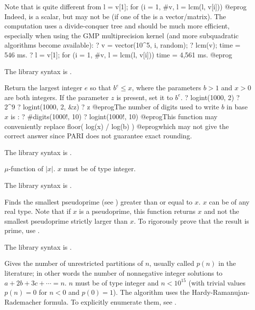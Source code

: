 Note that  is quite different from
\bprog
l = v[1]; for (i = 1, #v, l = lcm(l, v[i]))
@eprog\noindent
Indeed,  is a scalar, but  may not be (if one of
the  is a vector/matrix). The computation uses a divide-conquer tree
and should be much more efficient, especially when using the GMP
multiprecision kernel (and more subquadratic algorithms become available):
\bprog
? v = vector(10^5, i, random);
? lcm(v);
time = 546 ms.
? l = v[1]; for (i = 1, #v, l = lcm(l, v[i]))
time = 4,561 ms.
@eprog

The library syntax is .

\label{se:logint}
Return the largest integer $e$ so that $b^e \leq x$, where the
parameters $b > 1$ and $x > 0$ are both integers. If the parameter $z$ is
present, set it to $b^e$.
\bprog
? logint(1000, 2)
? 2^9
? logint(1000, 2, &z)
? z
@eprog\noindent The number of digits used to write $b$ in base $x$ is
:
\bprog
? #digits(1000!, 10)
? logint(1000!, 10)
@eprog\noindent This function may conveniently replace
\bprog
  floor( log(x) / log(b) )
@eprog\noindent which may not give the correct answer since PARI
does not guarantee exact rounding.

The library syntax is .

\label{se:moebius}
 $\mu$-function of $|x|$. $x$ must be of type integer.

The library syntax is .

\label{se:nextprime}
Finds the smallest pseudoprime (see
) greater than or equal to $x$. $x$ can be of any real
type. Note that if $x$ is a pseudoprime, this function returns $x$ and not
the smallest pseudoprime strictly larger than $x$. To rigorously prove that
the result is prime, use .

The library syntax is .

\label{se:numbpart}
Gives the number of unrestricted partitions of
$n$, usually called $p(n)$ in the literature; in other words the number of
nonnegative integer solutions to $a+2b+3c+\cdots=n$. $n$ must be of type
integer and $n<10^{15}$ (with trivial values $p(n) = 0$ for $n < 0$ and
$p(0) = 1$). The algorithm uses the Hardy-Ramanujan-Rademacher formula.
To explicitly enumerate them, see .

